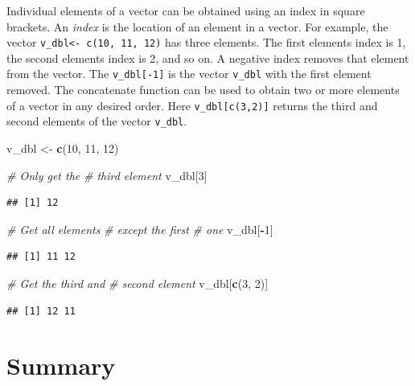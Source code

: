 \documentclass[
]{book}
\newenvironment{Shaded}{\begin{snugshade}}{\end{snugshade}}
\newcommand{\CommentTok}[1]{\textcolor[rgb]{0.56,0.35,0.01}{\textit{#1}}}
\newcommand{\DecValTok}[1]{\textcolor[rgb]{0.00,0.00,0.81}{#1}}
\newcommand{\KeywordTok}[1]{\textcolor[rgb]{0.13,0.29,0.53}{\textbf{#1}}}
\newcommand{\NormalTok}[1]{#1}
\newcommand{\OperatorTok}[1]{\textcolor[rgb]{0.81,0.36,0.00}{\textbf{#1}}}
\newcommand{\StringTok}[1]{\textcolor[rgb]{0.31,0.60,0.02}{#1}}
\begin{document}
Individual elements of a vector can be obtained using an index in square brackets. An \emph{index} is the location of an element in a vector. For example, the vector \texttt{v\_dbl\textless{}-\ c(10,\ 11,\ 12)} has three elements. The first elements index is 1, the second elements index is 2, and so on. A negative index removes that element from the vector. The \texttt{v\_dbl{[}-1{]}} is the vector \texttt{v\_dbl} with the first element removed. The concatenate function can be used to obtain two or more elements of a vector in any desired order. Here \texttt{v\_dbl{[}c(3,2){]}} returns the third and second elements of the vector \texttt{v\_dbl}.

\begin{Shaded}
\begin{Highlighting}[]
\NormalTok{v_dbl <-}\StringTok{ }\KeywordTok{c}\NormalTok{(}\DecValTok{10}\NormalTok{, }\DecValTok{11}\NormalTok{, }\DecValTok{12}\NormalTok{)}

\CommentTok{# Only get the}
\CommentTok{# third element}
\NormalTok{v_dbl[}\DecValTok{3}\NormalTok{]}
\end{Highlighting}
\end{Shaded}

\begin{verbatim}
## [1] 12
\end{verbatim}

\begin{Shaded}
\begin{Highlighting}[]
\CommentTok{# Get all elements}
\CommentTok{# except the first}
\CommentTok{# one}
\NormalTok{v_dbl[}\OperatorTok{-}\DecValTok{1}\NormalTok{]}
\end{Highlighting}
\end{Shaded}

\begin{verbatim}
## [1] 11 12
\end{verbatim}

\begin{Shaded}
\begin{Highlighting}[]
\CommentTok{# Get the third and}
\CommentTok{# second element}
\NormalTok{v_dbl[}\KeywordTok{c}\NormalTok{(}\DecValTok{3}\NormalTok{, }\DecValTok{2}\NormalTok{)]}
\end{Highlighting}
\end{Shaded}

\begin{verbatim}
## [1] 12 11
\end{verbatim}

\hypertarget{summary}{%
\section*{Summary}\label{summary}}
\end{document}
